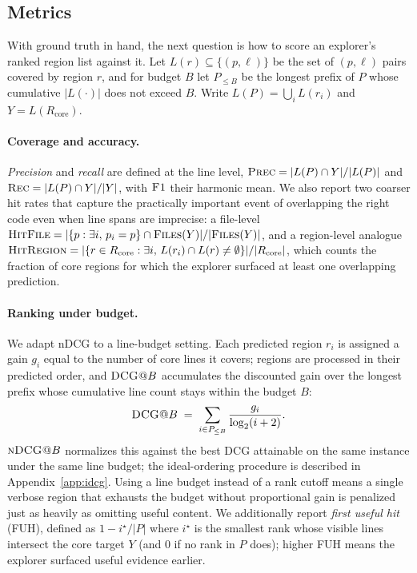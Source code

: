  
\subsection{Metrics}
\label{sec:metrics}
 
With ground truth in hand, the next question is how to score an explorer's ranked region list against it. Let $L(r) \subseteq \{(p, \ell)\}$ be the set of $(p, \ell)$ pairs covered by region $r$, and for budget $B$ let $P_{\leq B}$ be the longest prefix of $P$ whose cumulative $|L(\cdot)|$ does not exceed $B$. Write $L(P) = \bigcup_i L(r_i)$ and $Y = L(R_{\text{core}})$.
 
\paragraph{Coverage and accuracy.}

\emph{Precision} and \emph{recall} are defined at the line level,
$\textsc{Prec} = |L(P) \cap Y| / |L(P)|$ and $\textsc{Rec} = |L(P) \cap Y| / |Y|$, with $\textsc{F1}$ their harmonic mean. We also report two coarser hit rates that capture the practically important event of overlapping the right code even when line spans are imprecise: a file-level
$\textsc{HitFile} = |\{p : \exists i,\, p_i = p\} \cap \textsc{Files}(Y)| / |\textsc{Files}(Y)|$,
and a region-level analogue
$\textsc{HitRegion} = |\{r \in R_{\text{core}} : \exists i,\, L(r_i) \cap L(r) \neq \emptyset\}| / |R_{\text{core}}|$,
which counts the fraction of core regions for which the explorer surfaced at least one overlapping prediction.
 
\paragraph{Ranking under budget.}
We adapt nDCG to a line-budget setting. Each predicted region $r_i$ is assigned a gain $g_i$ equal to the number of core lines it covers; regions are processed in their predicted order, and $\textsc{DCG@}B$ accumulates the discounted gain over the longest prefix whose cumulative line count stays within the budget $B$:
\[
  \textsc{DCG@}B \;=\; \sum_{i \in P_{\leq B}} \frac{g_i}{\log_2(i+2)}.
\]
$\textsc{nDCG@}B$ normalizes this against the best DCG attainable on the same instance under the same line budget; the ideal-ordering procedure is described in Appendix~\ref{app:idcg}. Using a line budget instead of a rank cutoff means a single verbose region that exhausts the budget without proportional gain is penalized just as heavily as omitting useful content. We additionally report \emph{first useful hit} (FUH), defined as $1 - i^\star / |P|$ where $i^\star$ is the smallest rank whose visible lines intersect the core target $Y$ (and $0$ if no rank in $P$ does); higher FUH means the explorer surfaced useful evidence earlier.


